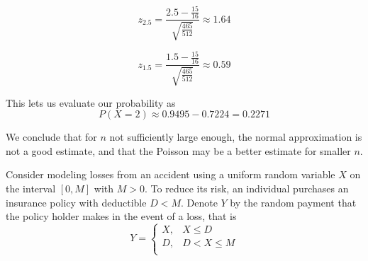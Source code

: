 \documentclass{exam}
\begin{document}
\begin{questions}
\begin{parts}
    $$z_{2.5} = \frac{2.5 - \frac{15}{16}}{\sqrt{\frac{465}{512}}} \approx 1.64$$

    $$z_{1.5} = \frac{1.5 - \frac{15}{16}}{\sqrt{\frac{465}{512}}} \approx 0.59$$

    This lets us evaluate our probability as
    $$P(X = 2) \approx 0.9495 - 0.7224 = 0.2271$$

    We conclude that for $n$ not sufficiently large enough, the normal approximation is not a good estimate, and that the Poisson may be a better estimate for smaller $n$.
\end{parts}



\newpage
\question
Consider modeling losses from an accident using a uniform random variable $X$ on the interval $[0, M]$ with $M > 0$. To reduce its risk, an individual purchases an insurance policy with deductible $D < M$. Denote $Y$ by the random payment that the policy holder makes in the event of a loss, that is
$$Y =
\begin{cases}
    X, & X \leq D \\
    D, & D < X \leq M \\
\end{cases}$$

\end{questions}
\end{document}
